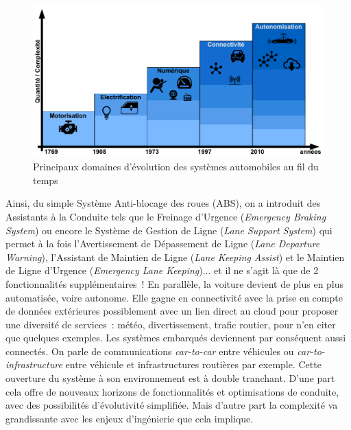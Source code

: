 \documentclass[french, a4paper, 11pt, twoside, pdftex]{StyleThese}
\begin{document}
		\begin{figure}[h]
			\centering
			\includegraphics[width=0.9\linewidth]{schemas/Evo_Sys_Automobile}
			\caption[Évolutions des Systèmes Automobiles]{Principaux domaines d'évolution des systèmes automobiles au fil du temps}
			\label{fig:evo_sys_automobile}
		\end{figure}

		Ainsi, du simple Système Anti-blocage des roues (ABS), on a introduit des Assistants à la Conduite tels que le Freinage d'Urgence (\textit{Emergency Braking System}) ou encore le Système de Gestion de Ligne (\textit{Lane Support System}) qui permet à la fois l'Avertissement de Dépassement de Ligne (\textit{Lane Departure Warning}), l'Assistant de Maintien de Ligne (\textit{Lane Keeping Assist}) et le Maintien de Ligne d'Urgence (\textit{Emergency Lane Keeping})... et il ne s'agit là que de 2 fonctionnalités supplémentaires~! En parallèle, la voiture devient de plus en plus automatisée, voire autonome. Elle gagne en connectivité avec la prise en compte de données extérieures possiblement avec un lien direct au cloud pour proposer une diversité de services~: météo, divertissement, trafic routier, pour n'en citer que quelques exemples.
		Les systèmes embarqués deviennent par conséquent aussi connectés. On parle de communications \emph{car-to-car} entre véhicules ou \emph{car-to-infrastructure} entre véhicule et infrastructures routières par exemple. 
		Cette ouverture du système à son environnement est à double tranchant. D'une part cela offre de nouveaux horizons de fonctionnalités et optimisations de conduite, avec des possibilités d'évolutivité simplifiée. Mais d'autre part la complexité va grandissante avec les enjeux d'ingénierie que cela implique. %
		 
\end{document}
